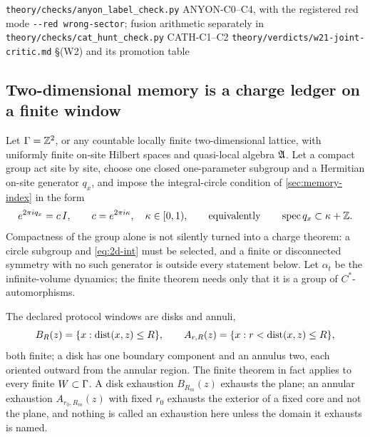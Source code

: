 %
{\texttt{theory/checks/anyon\_label\_check.py} ANYON-C0--C4, with the
registered red mode \texttt{-{}-red wrong-sector}; fusion arithmetic separately
in \texttt{theory/checks/cat\_hunt\_check.py} CATH-C1--C2}%
{\texttt{theory/verdicts/w21-joint-critic.md} \S(W2) and its promotion table}

\subsection{Two-dimensional memory is a charge ledger on a finite window}

\begin{definition}\label{def:2d-window-charge}
Let $\Gamma=\mathbb{Z}^{2}$, or any countable locally finite two-dimensional lattice,
with uniformly finite on-site Hilbert spaces and quasi-local algebra $\mathfrak{A}$.
Let a compact group act site by site, choose one closed one-parameter subgroup
and a Hermitian on-site generator $q_x$, and impose the integral-circle
condition of \cref{sec:memory-index} in the form
\begin{equation}
  e^{2\pi i q_x}=c\,I,\qquad c=e^{2\pi i\kappa},\quad\kappa\in[0,1),
  \qquad\text{equivalently}\qquad
  \operatorname{spec} q_x\subset\kappa+\mathbb{Z} .
  \label{eq:2d-int}
\end{equation}
Compactness of the group alone is not silently turned into a charge theorem: a
circle subgroup and \eqref{eq:2d-int} must be selected, and a finite or
disconnected symmetry with no such generator is outside every statement below.
Let $\alpha_t$ be the infinite-volume dynamics; the finite theorem needs only
that it is a group of $C^{*}$-automorphisms.

The declared protocol windows are disks and annuli,
\begin{equation}
  B_R(z)=\{x:\operatorname{dist}(x,z)\le R\},
  \qquad
  A_{r,R}(z)=\{x:r<\operatorname{dist}(x,z)\le R\},
  \label{eq:2d-windows}
\end{equation}
both finite; a disk has one boundary component and an annulus two, each
oriented outward from the annular region. The finite theorem in fact applies to
every finite $W\subset\Gamma$. A disk exhaustion $B_{R_m}(z)$ exhausts the
plane; an annular exhaustion $A_{r_0,R_m}(z)$ with fixed $r_0$ exhausts the
exterior of a fixed core and not the plane, and nothing is called an
exhaustion here unless the domain it exhausts is named.


\end{definition}
